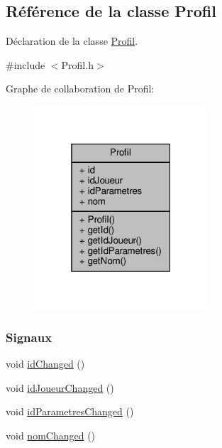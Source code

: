 \hypertarget{class_profil}{}\subsection{Référence de la classe Profil}
\label{class_profil}


Déclaration de la classe \hyperlink{class_profil}{Profil}.  




{\ttfamily \#include $<$Profil.\+h$>$}



Graphe de collaboration de Profil\+:\nopagebreak
\begin{figure}[H]
\begin{center}
\leavevmode
\includegraphics[width=184pt]{class_profil__coll__graph}
\end{center}
\end{figure}
\subsubsection*{Signaux}
\begin{DoxyCompactItemize}
\item 
void \hyperlink{class_profil_a0d67f046b27cfa936590d72a3fef82aa}{id\+Changed} ()
\item 
void \hyperlink{class_profil_a92c8857ab2dad933d36e3ab773c7ba80}{id\+Joueur\+Changed} ()
\item 
void \hyperlink{class_profil_a4cf050c31e7204366137b7d128c1d5f1}{id\+Parametres\+Changed} ()
\item 
void \hyperlink{class_profil_aa55e5770c76e28ab12296e675cc939fe}{nom\+Changed} ()
\end{DoxyCompactItemize}
